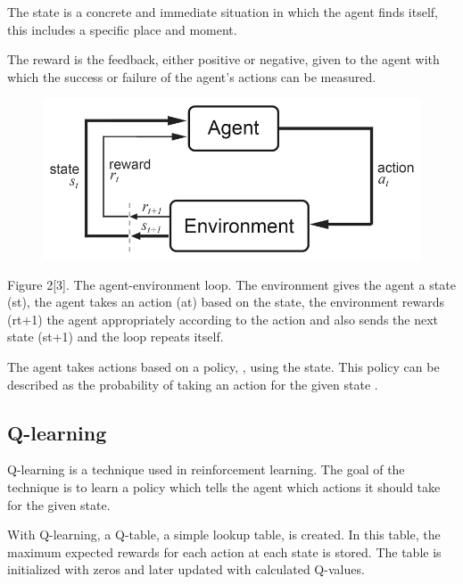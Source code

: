 \documentclass{article}
\begin{document}
\begin{flushleft}
The state is a concrete and immediate situation in which the agent finds itself, this includes a specific place and moment.
\end{flushleft}

\begin{flushleft}
The reward is the feedback, either positive or negative, given to the agent with which the success or failure of the agent’s actions can be measured.
\end{flushleft}

\begin{figure}
\includegraphics[width=\linewidth]{reinforcement_learning}
\end{figure}

\begin{flushleft}
Figure 2[3]. The agent-environment loop. The environment gives the agent a state (st), the agent takes an action (at) based on the state, the environment rewards (rt+1) the agent appropriately according to the action and also sends the next state (st+1) and the loop repeats itself.
\end{flushleft}

\begin{flushleft}
The agent takes actions based on a policy, , using the state. This policy can be described as the probability of taking an action  for the given state . 
\end{flushleft}

\subsection{Q-learning}
Q-learning is a technique used in reinforcement learning. The goal of the technique is to learn a policy which tells the agent which actions it should take for the given state. 

\begin{flushleft}
With Q-learning, a Q-table, a simple lookup table, is created. In this table, the maximum expected rewards for each action at each state is stored. The table is initialized with zeros and later updated with calculated Q-values.
\end{flushleft}
\end{document}
